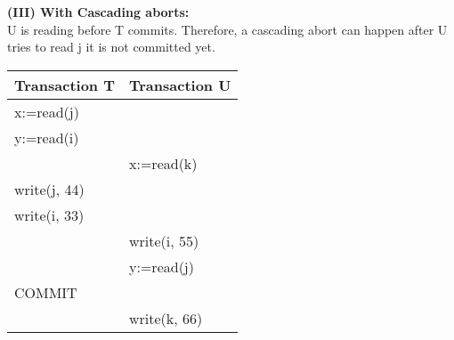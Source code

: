 \textbf{(III) With Cascading aborts:} \\
U is reading before T commits. Therefore, a cascading abort can happen after U tries to read j it is not committed yet. 

\begin{center}
	\begin{tabular}{| l | l |}
		\hline
		Transaction T & Transaction U \\ \hline
		x:=read(j) &  \\ \hline
		y:=read(i) &  \\ \hline
		 & x:=read(k) \\ \hline
		write(j, 44) &   \\ \hline
		write(i, 33) & \\ \hline
		 & write(i, 55) \\ \hline
		 & y:=read(j) \\ \hline
		COMMIT &  \\ \hline
		 & write(k, 66)  \\
		\hline
	\end{tabular}
\end{center}